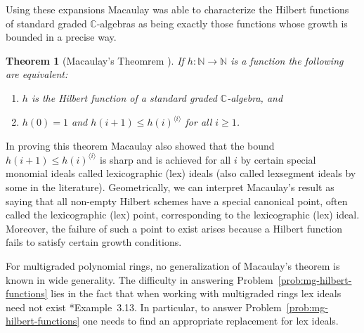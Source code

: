 \documentclass[11pt,reqno]{amsart}
\newtheorem{theorem}[lemma]{Theorem}
\theoremstyle{remark}
\newtheorem{example}[lemma]{Example}
\newcommand{\C}{\mathbb{C}}
\newcommand{\N}{\mathbb{N}}
\newcommand{\Z}{\mathbb{Z}}
\begin{document}

Using these expansions Macaulay was able to characterize the Hilbert functions of standard graded $\C$-algebras as being exactly those functions whose growth is bounded in a precise way. 

\begin{theorem}[Macaulay's Theomrem \cite{macaulay27}]
If $h:\N \to \N$ is a function the following are equivalent:
\begin{enumerate}
	\item $h$ is the Hilbert function of a standard graded $\C$-algebra, and
	\item $h(0)=1$ and  $h(i+1) \leq h(i)^{\langle i \rangle}$ for all $i\geq1$.\end{enumerate}
\end{theorem}

In proving this theorem Macaulay also showed that the bound $h(i+1) \leq h(i)^{\langle i \rangle}$ is sharp and is achieved for all $i$ by certain special monomial ideals called lexicographic (lex) ideals (also called lexsegment ideals by some in the literature). Geometrically, we can interpret Macaulay's result as saying that all non-empty Hilbert schemes have a special canonical point, often called the lexicographic (lex) point, corresponding to the lexicographic (lex) ideal. Moreover, the failure of such a point to exist arises because a Hilbert function fails to satisfy certain growth conditions. 

For multigraded polynomial rings, no generalization of Macaulay's theorem is known in wide generality. The difficulty in answering Problem~\ref{prob:mg-hilbert-functions} lies in the fact that when working with multigraded rings lex ideals need not exist \cite{maclaganSmith10}*{Example~3.13}. In particular, to answer Problem~\ref{prob:mg-hilbert-functions} one needs to find an appropriate replacement for lex ideals. 
\end{document}
